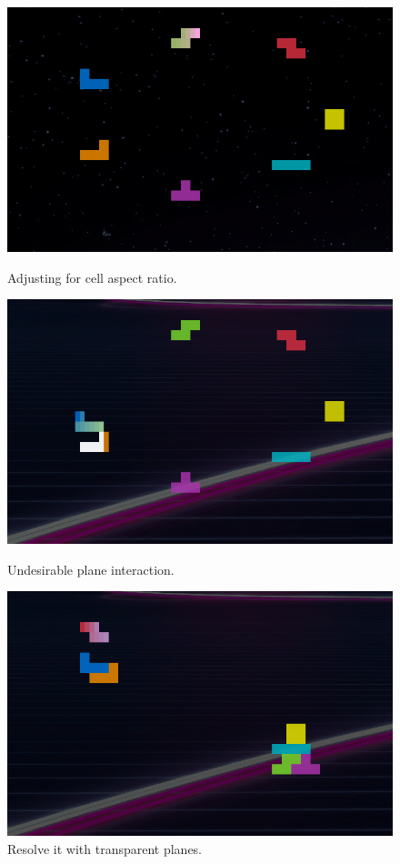 \begin{figure}[!htbp]
  \begin{minipage}{0.30\textwidth}
    \includegraphics[width=1\linewidth]{media/tetrimino-gradient6.png}
    \caption{Adjusting for cell aspect ratio.}
  \end{minipage}\hfill
  \begin{minipage}{0.30\textwidth}
    \includegraphics[width=1\linewidth]{media/tetrimino-gradient7.png}
    \caption{Undesirable plane interaction.}
    \label{fig:tetrimino-badplane}
  \end{minipage}\hfill
  \begin{minipage}{0.30\textwidth}
    \includegraphics[width=1\linewidth]{media/tetrimino-gradient8.png}
    \caption{Resolve it with transparent planes.}
    \label{fig:tetrimino-trans}
  \end{minipage}\hfill
\end{figure}

